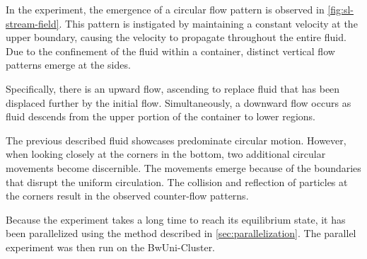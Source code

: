 In the experiment, the emergence of a circular flow pattern is observed in \cref{fig:sl-stream-field}.
This pattern is instigated by maintaining a constant velocity at the upper boundary, causing the velocity to propagate throughout the entire fluid.
Due to the confinement of the fluid within a container, distinct vertical flow patterns emerge at the sides.

Specifically, there is an upward flow, ascending to replace fluid that has been displaced further by the initial flow.
Simultaneously, a downward flow occurs as fluid descends from the upper portion of the container to lower regions.
\newline

The previous described fluid showcases predominate circular motion.
However, when looking closely at the corners in the bottom, two additional circular movements become discernible.
The movements emerge because of the boundaries that disrupt the uniform circulation.
The collision and reflection of particles at the corners result in the observed counter-flow patterns.
\newline

Because the experiment takes a long time to reach its equilibrium state, it has been parallelized using the method described in \cref{sec:parallelization}.
The parallel experiment was then run on the BwUni-Cluster.


